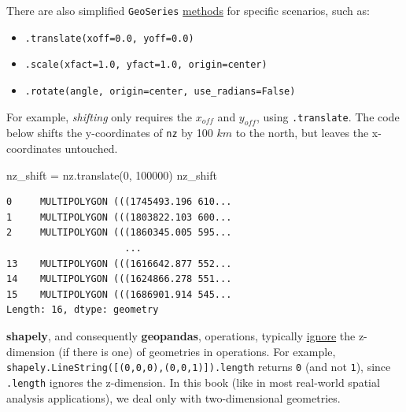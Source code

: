 \documentclass[
  letterpaper,
]{krantz}
\newenvironment{Shaded}{\begin{snugshade}}{\end{snugshade}}
\newcommand{\DecValTok}[1]{\textcolor[rgb]{0.68,0.00,0.00}{#1}}
\newcommand{\NormalTok}[1]{\textcolor[rgb]{0.00,0.23,0.31}{#1}}
\newcommand{\OperatorTok}[1]{\textcolor[rgb]{0.37,0.37,0.37}{#1}}
\providecommand{\tightlist}{%
  \setlength{\itemsep}{0pt}\setlength{\parskip}{0pt}}\usepackage{longtable,booktabs,array}
\begin{document}
There are also simplified \texttt{GeoSeries}
\href{https://geopandas.org/en/stable/docs/user_guide/geometric_manipulations.html\#affine-transformations}{methods}
for specific scenarios, such as:

\begin{itemize}
\tightlist
\item
  \texttt{.translate(xoff=0.0,\ yoff=0.0)}
\item
  \texttt{.scale(xfact=1.0,\ yfact=1.0,\ origin=\textquotesingle{}center\textquotesingle{})}
\item
  \texttt{.rotate(angle,\ origin=\textquotesingle{}center\textquotesingle{},\ use\_radians=False)}
\end{itemize}

For example, \emph{shifting} only requires the \(x_{off}\) and
\(y_{off}\), using \texttt{.translate}. The code below shifts the
y-coordinates of \texttt{nz} by 100 \(km\) to the north, but leaves the
x-coordinates untouched.

\begin{Shaded}
\begin{Highlighting}[]
\NormalTok{nz\_shift }\OperatorTok{=}\NormalTok{ nz.translate(}\DecValTok{0}\NormalTok{, }\DecValTok{100000}\NormalTok{)}
\NormalTok{nz\_shift}
\end{Highlighting}
\end{Shaded}

\begin{verbatim}
0     MULTIPOLYGON (((1745493.196 610...
1     MULTIPOLYGON (((1803822.103 600...
2     MULTIPOLYGON (((1860345.005 595...
                     ...                
13    MULTIPOLYGON (((1616642.877 552...
14    MULTIPOLYGON (((1624866.278 551...
15    MULTIPOLYGON (((1686901.914 545...
Length: 16, dtype: geometry
\end{verbatim}

\begin{tcolorbox}[enhanced jigsaw, title=\textcolor{quarto-callout-note-color}{\faInfo}\hspace{0.5em}{Note}, arc=.35mm, toprule=.15mm, titlerule=0mm, colframe=quarto-callout-note-color-frame, breakable, toptitle=1mm, bottomtitle=1mm, rightrule=.15mm, colbacktitle=quarto-callout-note-color!10!white, leftrule=.75mm, left=2mm, bottomrule=.15mm, opacityback=0, coltitle=black, opacitybacktitle=0.6, colback=white]

\textbf{shapely}, and consequently \textbf{geopandas}, operations,
typically
\href{https://shapely.readthedocs.io/en/stable/manual.html\#geometric-objects}{ignore}
the z-dimension (if there is one) of geometries in operations. For
example, \texttt{shapely.LineString({[}(0,0,0),(0,0,1){]}).length}
returns \texttt{0} (and not \texttt{1}), since \texttt{.length} ignores
the z-dimension. In this book (like in most real-world spatial analysis
applications), we deal only with two-dimensional geometries.

\end{tcolorbox}
\end{document}
